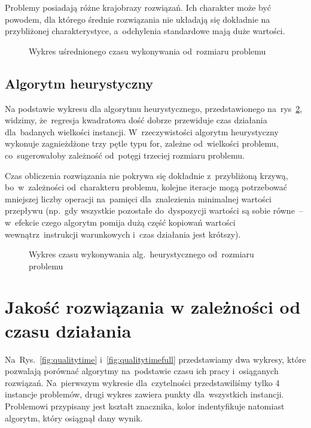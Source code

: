 \documentclass[a4paper,10pt]{article}
\begin{document}
Problemy posiadają różne krajobrazy rozwiązań.
Ich charakter może być powodem, dla którego średnie rozwiązania nie układają się dokładnie na przybliżonej charakterystyce,
a~odchylenia standardowe mają duże wartości.

\begin{figure}[!htpb]
\begin{center}

\caption{Wykres uśrednionego czasu wykonywania od~rozmiaru problemu}
\label{fig:timesize}
\end{center}
\end{figure}

\subsection{Algorytm heurystyczny}
Na podstawie wykresu dla algorytmu heurystycznego, przedstawionego na~rys~\ref{fig:timesizeheuristic},
widzimy, że~regresja kwadratowa dość dobrze przewiduje czas działania dla~badanych wielkości instancji.
W~rzeczywistości algorytm heurystyczny wykonuje zagnieżdżone trzy pętle typu for, zależne od~wielkości problemu,
co~sugerowałoby zależność od~potęgi trzeciej rozmiaru problemu.

Czas obliczenia rozwiązania nie pokrywa się dokładnie z~przybliżoną krzywą, bo~w~zależności od~charakteru problemu,
kolejne iteracje mogą potrzebować mniejszej liczby operacji na~pamięci dla~znalezienia minimalnej wartości przepływu
(np.~gdy wszystkie pozostałe do~dyspozycji wartości są sobie równe~-- w~efekcie czego algorytm pomija dużą część kopiowań
wartości wewnątrz~instrukcji warunkowych i~czas działania jest krótszy).

\begin{figure}[!htpb]
\begin{center} 

\caption{Wykres czasu wykonywania alg.~heurystycznego od~rozmiaru problemu}
\label{fig:timesizeheuristic}
\end{center}
\end{figure}

%

\section{Jakość rozwiązania w zależności od czasu działania}
Na~Rys.~\ref{fig:qualitytime} i~\ref{fig:qualitytimefull} przedstawiamy dwa wykresy,
które pozwalają porównać algorytmy na~podstawie czasu ich pracy i~osiąganych rozwiązań.
Na~pierwszym wykresie dla~czytelności przedstawiliśmy tylko 4 instancje problemów, drugi wykres zawiera punkty dla~wszystkich instancji. 
Problemowi przypisany jest kształt znacznika, kolor indentyfikuje natomiast algorytm, który osiągnął dany wynik.
\end{document}
